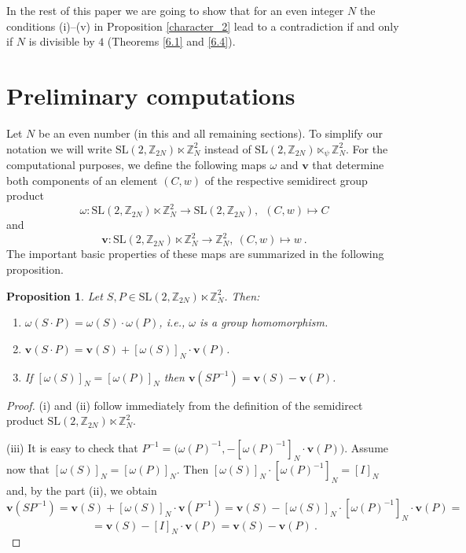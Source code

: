 \documentclass[10pt]{amsart}
\theoremstyle{plain}
\newtheorem{proposition}[theorem]{Proposition}
\theoremstyle{definition}
\theoremstyle{remark}%
\newcommand{\Z}{\mathbb{Z}}
\newcommand{\f}{\mathbf{v}}
\newcommand{\g}{\omega}
\newcommand{\SL}{\mathrm{SL}}
\begin{document}



In the rest of this paper we are going to show that for an even integer $N$ the conditions (i)--(v) in Proposition \ref{character_2} lead to a contradiction if and only if $N$ is divisible by $4$ (Theorems \ref{6.1} and \ref{6.4}). 






\section{Preliminary computations}\label{section_7}

Let $N$ be an even number (in this and all remaining sections). To simplify our notation we will write  $\SL(2,\Z_{2N})\ltimes \Z_{N}^2$ instead of $\SL(2,\Z_{2N})\ltimes_{\psi} \Z_{N}^2$.
For the computational purposes, we define the following  maps $\g$ and $\f$ that determine both components of an element $(C,w)$ of the respective semidirect group product
$$\g:\SL(2,\Z_{2N})\ltimes \Z_{N}^2\to \SL(2,\Z_{2N}), \ \ (C,w)\mapsto C$$ and
$$\f:\SL(2,\Z_{2N})\ltimes \Z_{N}^2\to \Z_{N}^2, \ (C,w)\mapsto w\ .$$ 
The important basic properties of these maps are summarized in the following proposition.
\begin{proposition}\label{basic_0}
Let $S,P\in \SL(2,\Z_{2N})\ltimes \Z_{N}^2$. Then:
\begin{enumerate}
 \item[(i)] $\g(S\cdot P)=\g(S)\cdot\g(P)$, i.e., $\g$ is a group homomorphism.
 \item[(ii)] $\f(S\cdot P)=\f(S)+[\g(S)]_{N}\cdot\f(P)$.
 \item[(iii)] If $[\g(S)]_N=[\g(P)]_N$ then $\f(SP^{-1})=\f(S)-\f(P)$. 
\end{enumerate}
\end{proposition}
\begin{proof}
 (i) and (ii) follow immediately from the definition of the semidirect product $\SL(2,\Z_{2N})\ltimes \Z_{N}^2$.
 
 (iii) It is easy to check that $P^{-1}=\big(\g(P)^{-1},-[\g(P)^{-1}]_N\cdot \f(P)\big)$. Assume now that $[\g(S)]_N=[\g(P)]_N$. Then $[\g(S)]_N\cdot [\g(P)^{-1}]_N=[I]_N$ and, by the part (ii), we obtain  $$\f(SP^{-1})=\f(S)+ [\g(S)]_N\cdot \f(P^{-1})=\f(S)- [\g(S)]_N\cdot [\g(P)^{-1}]_N\cdot \f(P)=$$
 $$=\f(S)- [I]_N\cdot \f(P)=\f(S)- \f(P)\ .$$
\end{proof}
\end{document}
